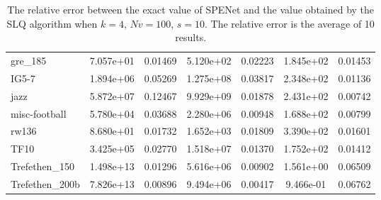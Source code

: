 \documentclass[senior,final,11pt]{iscs-thesis}
\begin{document}
\begin{table}[htb]
\begin{center}
{\begin{tabular}{l | c c | c c | c c }
        gre\_185 & 7.057e+01 & 0.01469 & 5.120e+02 & 0.02223 & 1.845e+02 & 0.01453\\
        IG5-7 & 1.894e+06 & 0.05269 & 1.275e+08 & 0.03817 & 2.348e+02 & 0.01136\\
        jazz & 5.872e+07 & 0.12467 & 9.929e+09 & 0.01878 & 2.431e+02 & 0.00742\\
        misc-football & 5.780e+04 & 0.03688 & 2.280e+06 & 0.00948 & 1.688e+02 & 0.00799\\
        rw136 & 8.680e+01 & 0.01732 & 1.652e+03 & 0.01809 & 3.390e+02 & 0.01601\\
        TF10 & 3.425e+05 & 0.02770 & 1.518e+07 & 0.01370 & 1.752e+02 & 0.01412\\
        Trefethen\_150 & 1.498e+13 & 0.01296 & 5.616e+06 & 0.00902 & 1.561e+00 & 0.06509\\
        Trefethen\_200b & 7.826e+13 & 0.00896 & 9.494e+06 & 0.00417 & 9.466e-01 & 0.06762\\
      \end{tabular}
      }
      \caption{The relative error between the exact value of SPENet and the value obtained by the SLQ algorithm when $k=4$, $Nv = 100$, $s= 10$. The relative error is the average of 10 results.}
      \label{tab:rel_error_k4}
    \end{center}
  \end{table}
\end{document}
